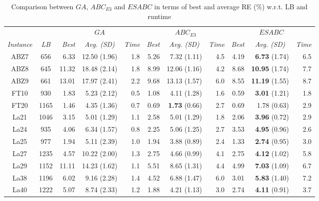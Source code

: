 \documentclass[icae]{iosart2x}
\newcommand{\reviewed}[1]{#1} %
\begin{document}
\begin{table}[tbh]
\small
\centering
\caption{\reviewed{Comparison between $GA$, $ABC_{E3}$ and $ESABC$ in terms of best and average RE (\%) w.r.t. LB and runtime}}
\setlength{\tabcolsep}{1.5mm}%
\label{table:expResultsEV}
\begin{tabular}{c|c|rrr|rrr|rrr}
\toprule
 & & \multicolumn{3}{c|}{$GA$}& \multicolumn{3}{c|}{$ABC_{E3}$}& \multicolumn{3}{c}{$ESABC$} \\
\textit{Instance}  & \textit{LB} & \textit{Best} & \multicolumn{1}{c}{\reviewed{\textit{Avg. \tiny{(SD)}}}} & \textit{Time}  & \textit{Best} & \multicolumn{1}{c}{\reviewed{\textit{Avg. \tiny{(SD)}}}} & \textit{Time} & \textit{Best} & \multicolumn{1}{c}{\reviewed{\textit{Avg. \tiny{(SD)}}}} & \textit{Time} \\
\midrule
ABZ7 & 656 & 6.33 & 12.50 \tiny{(1.96)} & 1.8 & 5.26 & 7.32 \tiny{(1.11)} & 4.5 & 4.19 & \textbf{6.73} \tiny{(1.74)} & 6.5 \\
ABZ8 & 645 & 11.32 & 18.48 \tiny{(2.14)} & 1.8 & 8.99 & 12.06 \tiny{(1.16)} & 4.2 & 8.68 & \textbf{10.95} \tiny{(1.74)} & 7.7 \\
ABZ9 & 661 & 13.01 & 17.97 \tiny{(2.41)} & 2.2 & 9.68 & 13.13 \tiny{(1.57)} & 6.0 & 8.55 & \textbf{11.19} \tiny{(1.55)} & 8.7 \\
FT10 & 930 & 1.83 & 5.23 \tiny{(2.12)} & 0.5 & 1.08 & 4.11 \tiny{(1.28)} & 1.6 & 0.59 & \textbf{3.01} \tiny{(1.21)} & 1.8 \\
FT20 & 1165 & 1.46 & 4.35 \tiny{(1.36)} & 0.7 & 0.69 & \textbf{1.73} \tiny{(0.66)} & 2.7 & 0.69 & 1.78 \tiny{(0.63)} & 2.9 \\
La21 & 1046 & 3.15 & 5.01 \tiny{(1.29)} & 1.1 & 2.58 & 5.01 \tiny{(1.29)} & 1.8 & 2.06 & \textbf{3.96} \tiny{(0.72)} & 2.9 \\
La24 & 935 & 4.06 & 6.34 \tiny{(1.57)} & 0.8 & 2.25 & 5.06 \tiny{(1.25)} & 2.7 & 3.53 & \textbf{4.95} \tiny{(0.96)} & 2.6 \\
La25 & 977 & 1.94 & 5.11 \tiny{(2.39)} & 1.0 & 1.94 & 3.88 \tiny{(0.89)} & 2.4 & 1.33 & \textbf{2.74} \tiny{(0.95)} & 3.0 \\
La27 & 1235 & 4.57 & 10.22 \tiny{(2.00)} & 1.3 & 2.75 & 4.66 \tiny{(0.99)} & 4.1 & 2.75 & \textbf{4.12} \tiny{(1.02)} & 5.8 \\
La29 & 1152 & 11.11 & 14.23 \tiny{(1.62)} & 1.1 & 5.51 & 8.65 \tiny{(1.31)} & 4.4 & 4.99 & \textbf{7.03} \tiny{(1.09)} & 6.7 \\
La38 & 1196 & 6.02 & 9.16 \tiny{(2.28)} & 1.4 & 4.52 & 6.88 \tiny{(1.47)} & 6.0 & 3.01 & \textbf{5.83} \tiny{(1.40)} & 7.2 \\
La40 & 1222 & 5.07 & 8.74 \tiny{(2.33)} & 1.2 & 1.88 & 4.21 \tiny{(1.13)} & 3.0 & 2.74 & \textbf{4.11} \tiny{(0.91)} & 3.7 \\
\bottomrule
\end{tabular}
\end{table}
\end{document}
